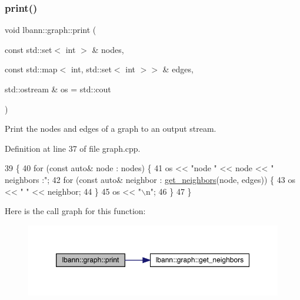 \subsubsection{\texorpdfstring{print()}{print()}}
{\footnotesize\ttfamily void lbann\+::graph\+::print (\begin{DoxyParamCaption}\item[{const std\+::set$<$ int $>$ \&}]{nodes,  }\item[{const std\+::map$<$ int, std\+::set$<$ int $>$$>$ \&}]{edges,  }\item[{std\+::ostream \&}]{os = {\ttfamily std\+:\+:cout} }\end{DoxyParamCaption})}

Print the nodes and edges of a graph to an output stream. 

Definition at line 37 of file graph.\+cpp.


\begin{DoxyCode}
39                            \{
40   \textcolor{keywordflow}{for} (\textcolor{keyword}{const} \textcolor{keyword}{auto}& node : nodes) \{
41     os << \textcolor{stringliteral}{"node "} << node << \textcolor{stringliteral}{" neighbors :"};
42     \textcolor{keywordflow}{for} (\textcolor{keyword}{const} \textcolor{keyword}{auto}& neighbor : \hyperlink{namespacelbann_1_1graph_ad305e0d104d25d9cb1e63a4b93c0847c}{get\_neighbors}(node, edges)) \{
43       os << \textcolor{stringliteral}{" "} << neighbor;
44     \}
45     os << \textcolor{stringliteral}{"\(\backslash\)n"};
46   \}
47 \}
\end{DoxyCode}
Here is the call graph for this function\+:\nopagebreak
\begin{figure}[H]
\begin{center}
\leavevmode
\includegraphics[width=350pt]{namespacelbann_1_1graph_a956e9f6f1b842a2ffe5bda9015bbb906_cgraph}
\end{center}
\end{figure}
\mbox{\label{namespacelbann_1_1graph_aeb19a22d8fac402df104ed8d547a10ee}} 
